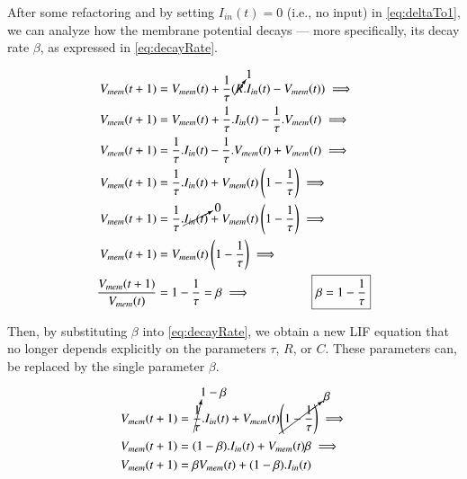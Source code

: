			\par After some refactoring and by setting $I_{in}(t) = 0$ (i.e., no input) in \autoref{eq:deltaTo1}, we can analyze how the membrane potential decays — more specifically, its decay rate $\beta$, as expressed in \autoref{eq:decayRate}.
			
			\begin{equation}
				\label{eq:decayRate}
				\begin{aligned}
					V_{mem}(t + 1) &= V_{mem}(t) + \dfrac{1}{\tau} (\cancelto{1}{R}.I_{in}(t) - V_{mem}(t)) \implies \\
					V_{mem}(t + 1) &= V_{mem}(t) + \dfrac{1}{\tau}.I_{in}(t) - \dfrac{1}{\tau}.V_{mem}(t) \implies \\
					V_{mem}(t + 1) &= \dfrac{1}{\tau}.I_{in}(t) - \dfrac{1}{\tau}.V_{mem}(t)+V_{mem}(t) \implies \\
					V_{mem}(t + 1) &= \dfrac{1}{\tau}.I_{in}(t) + V_{mem}(t) \left( 1 - \dfrac{1}{\tau} \right) \implies \\
					V_{mem}(t + 1) &= \dfrac{1}{\tau}.\cancelto{0}{I_{in}(t)} + V_{mem}(t) \left( 1 - \dfrac{1}{\tau} \right) \implies \\
					V_{mem}(t + 1) &= V_{mem}(t) \left( 1 - \dfrac{1}{\tau} \right) \implies \\
					\dfrac{V_{mem}(t + 1)}{V_{mem}(t)} &= 1 - \dfrac{1}{\tau} = \beta \implies \Aboxed{\beta = 1 - \dfrac{1}{\tau}}
				\end{aligned}
			\end{equation}
			
			\par Then, by substituting $\beta$ into \autoref{eq:decayRate}, we obtain a new LIF equation that no longer depends explicitly on the parameters $\tau$, $R$, or $C$. These parameters can, be replaced by the single parameter $\beta$.
			
			\begin{equation}
				\label{eq:lifWithBeta}
				\begin{aligned}
					V_{mem}(t + 1) &= \cancelto{1 - \beta}{\dfrac{1}{\tau}}.I_{in}(t) + V_{mem}(t) \cancelto{\beta}{ \left( 1 - \dfrac{1}{\tau} \right)} \implies \\
					V_{mem}(t + 1) &= (1 - \beta).I_{in}(t) + V_{mem}(t) \beta \implies \\
					V_{mem}(t + 1) &= \beta V_{mem}(t) + (1 - \beta).I_{in}(t) \\
				\end{aligned}
			\end{equation}
			
